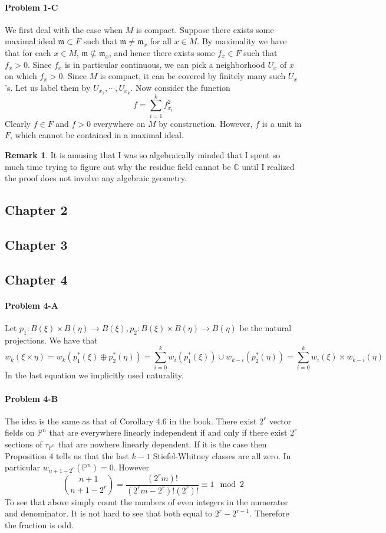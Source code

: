 \documentclass[12pt]{article}
\theoremstyle{plain}
\theoremstyle{definition}
\newtheorem{remark}[equation]{Remark}
\newcommand{\IC}{\mathbb{C}}
\newcommand{\IP}{\mathbb{P}}
\newcommand{\<}{\langle}
\renewcommand{\>}{\rangle}
\newcommand{\fm}{\mathfrak{m}}
\begin{document}
\paragraph{Problem 1-C} We first deal with the case when $M$ is compact. Suppose there exists some maximal ideal $\fm \subset F$ such that $\fm \neq \fm_x$ for all $x \in M$. By maximality we have that for each $x \in M$, $\fm \not\subseteq \fm_x$, and hence there exists some $f_x \in F$ such that $f_x > 0$. Since $f_x$ is in particular continuous, we can pick a neighborhood $U_x$ of $x$ on which $f_x > 0$. Since $M$ is compact, it can be covered by finitely many such $U_x$'s. Let us label them by $U_{x_1}, \cdots, U_{x_k}$. Now consider the function $$f = \sum_{i = 1}^k f_{x_i}^2 $$
Clearly $f \in F$ and $f > 0$ everywhere on $M$ by construction. However, $f$ is a unit in $F$, which cannot be contained in a maximal ideal. 
\begin{remark}
It is amusing that I was so algebraically minded that I spent so much time trying to figure out why the residue field cannot be $\IC$ until I realized the proof does not involve any algebraic geometry. 
\end{remark}


\subsection*{Chapter 2}
\subsection*{Chapter 3}
\subsection*{Chapter 4}
\paragraph{Problem 4-A} Let $p_1 : B(\xi) \times B(\eta) \to B(\xi), p_2 : B(\xi) \times B(\eta) \to B(\eta)$ be the natural projections. We have that 
$$ w_k(\xi \times \eta) = w_k( p_1^*(\xi) \oplus p_2^*(\eta)) = \sum_{i = 0}^k w_i(p_1^*(\xi)) \cup w_{k-i}(p_2^*(\eta)) = \sum_{i = 0}^k w_i(\xi) \times w_{k - i}(\eta)$$
In the last equation we implicitly used naturality. 

\paragraph{Problem 4-B} The idea is the same as that of Corollary 4.6 in the book. There exist $2^r$ vector fields on $\IP^n$ that are everywhere linearly independent if and only if there exist $2^r$ sections of $\tau_{\IP^n}$ that are nowhere linearly dependent. If it is the case then Proposition 4 tells us that the last $ k - 1$ Stiefel-Whitney classes are all zero. In particular $ w_{n + 1 - 2^r} (\IP^n)= 0$. However 
$$ { n + 1 \choose n+1-2^r } = \frac{ (2^r m)! }{(2^r m - 2^r)! (2^r) !} \equiv 1 \mod 2 $$ 
To see that above simply count the numbers of even integers in the numerator and denominator. It is not hard to see that both equal to $2^r - 2^{r - 1}$. Therefore the fraction is odd.  
\end{document}
